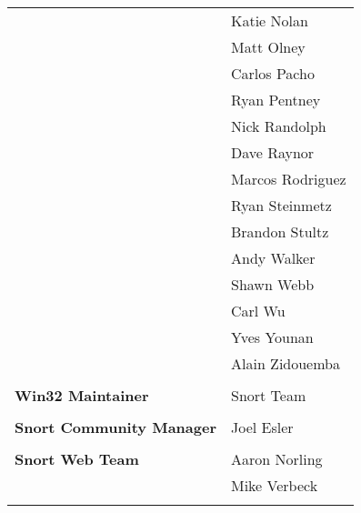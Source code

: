 \documentclass[english]{report}
\begin{document}
\begin{tabular}{p{3in} p{3in}}
& Katie Nolan\\
& Matt Olney\\
& Carlos Pacho\\
& Ryan Pentney\\
& Nick Randolph\\
& Dave Raynor\\
& Marcos Rodriguez\\
& Ryan Steinmetz\\
& Brandon Stultz\\
& Andy Walker\\
& Shawn Webb\\
& Carl Wu\\
& Yves Younan\\
& Alain Zidouemba\\ 
\\
\textbf{Win32 Maintainer}
& Snort Team\\
\\
\textbf{Snort Community Manager}
& Joel Esler\\
\\
\textbf{Snort Web Team}
& Aaron Norling\\
& Mike Verbeck\\
\\
\end{tabular}
\end{document}
